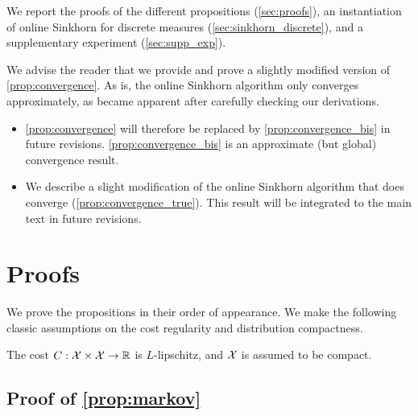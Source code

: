 We report the proofs of the different propositions (\autoref{sec:proofs}), an instantiation of online Sinkhorn for discrete measures (\autoref{sec:sinkhorn_discrete}), and a supplementary experiment (\autoref{sec:supp_exp}).

We advise the reader that we provide and prove a slightly modified version of \autoref{prop:convergence}. As is, the online Sinkhorn algorithm only converges approximately, as became apparent after carefully checking our derivations.

\begin{itemize}
    \item \autoref{prop:convergence} will therefore be replaced by
    \autoref{prop:convergence_bis} in future revisions. \autoref{prop:convergence_bis} is an approximate (but global) convergence result.
    \item We describe a slight modification of the online Sinkhorn algorithm that
    does converge (\autoref{prop:convergence_true}). This result will be
    integrated to the main text in future revisions.
\end{itemize}

\section{Proofs}\label{sec:proofs}

We prove the propositions in their order of appearance. We make the following classic assumptions on the cost regularity and distribution compactness.

\begin{assumption}\label{ass:lip}
    The cost $C: \mathcal{X} \times \mathcal{X} \to \mathbb{R}$ is $L$-lipschitz, and $\mathcal{X}$ is assumed to be compact.
\end{assumption}

\subsection{Proof of \autoref{prop:markov}}

